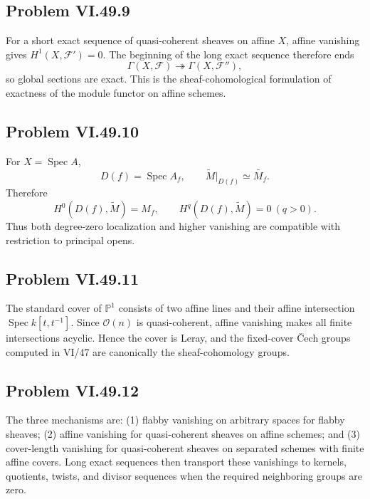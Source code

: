 \subsection*{Problem VI.49.9}
\begin{solution}
For a short exact sequence of quasi-coherent sheaves on affine \(X\), affine vanishing gives \(H^1(X,\mathcal F')=0\).  The beginning of the long exact sequence therefore ends
\[
\Gamma(X,\mathcal F)\twoheadrightarrow\Gamma(X,\mathcal F''),
\]
so global sections are exact.  This is the sheaf-cohomological formulation of exactness of the module functor on affine schemes.
\end{solution}

\subsection*{Problem VI.49.10}
\begin{solution}
For \(X=\operatorname{Spec}A\),
\[
D(f)=\operatorname{Spec}A_f,\qquad
\widetilde M|_{D(f)}\simeq\widetilde{M_f}.
\]
Therefore
\[
H^0(D(f),\widetilde M)=M_f,\qquad
H^q(D(f),\widetilde M)=0\ (q>0).
\]
Thus both degree-zero localization and higher vanishing are compatible with restriction to principal opens.
\end{solution}

\subsection*{Problem VI.49.11}
\begin{solution}
The standard cover of \(\mathbb P^1\) consists of two affine lines and their affine intersection \(\operatorname{Spec}k[t,t^{-1}]\).  Since \(\mathcal O(n)\) is quasi-coherent, affine vanishing makes all finite intersections acyclic.  Hence the cover is Leray, and the fixed-cover Čech groups computed in VI/47 are canonically the sheaf-cohomology groups.
\end{solution}

\subsection*{Problem VI.49.12}
\begin{solution}
The three mechanisms are: (1) flabby vanishing on arbitrary spaces for flabby sheaves; (2) affine vanishing for quasi-coherent sheaves on affine schemes; and (3) cover-length vanishing for quasi-coherent sheaves on separated schemes with finite affine covers.  Long exact sequences then transport these vanishings to kernels, quotients, twists, and divisor sequences when the required neighboring groups are zero.
\end{solution}

